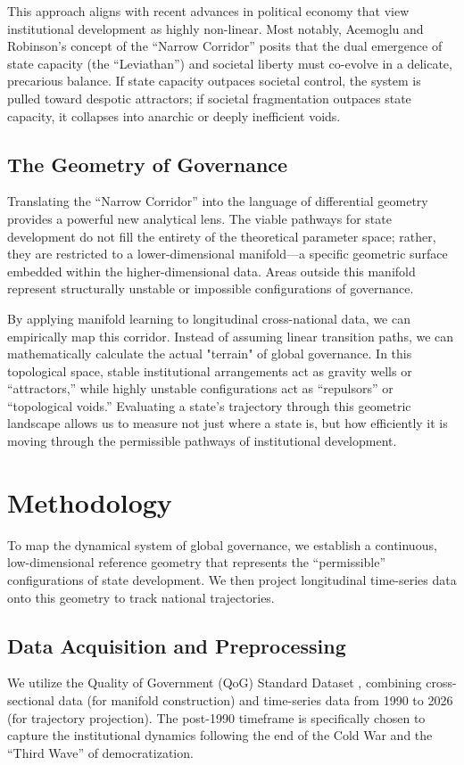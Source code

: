 \documentclass[12pt]{article}
\begin{document}
This approach aligns with recent advances in political economy that view institutional development as highly non-linear. Most notably, Acemoglu and Robinson's concept of the ``Narrow Corridor'' \cite{acemoglu2019narrow} posits that the dual emergence of state capacity (the ``Leviathan'') and societal liberty must co-evolve in a delicate, precarious balance. If state capacity outpaces societal control, the system is pulled toward despotic attractors; if societal fragmentation outpaces state capacity, it collapses into anarchic or deeply inefficient voids.

\subsection{The Geometry of Governance}
Translating the ``Narrow Corridor'' into the language of differential geometry provides a powerful new analytical lens. The viable pathways for state development do not fill the entirety of the theoretical parameter space; rather, they are restricted to a lower-dimensional manifold—a specific geometric surface embedded within the higher-dimensional data. Areas outside this manifold represent structurally unstable or impossible configurations of governance.

By applying manifold learning to longitudinal cross-national data, we can empirically map this corridor. Instead of assuming linear transition paths, we can mathematically calculate the actual "terrain" of global governance. In this topological space, stable institutional arrangements act as gravity wells or ``attractors,'' while highly unstable configurations act as ``repulsors'' or ``topological voids.'' Evaluating a state's trajectory through this geometric landscape allows us to measure not just where a state is, but how efficiently it is moving through the permissible pathways of institutional development.

\section{Methodology}

To map the dynamical system of global governance, we establish a continuous, low-dimensional reference geometry that represents the ``permissible'' configurations of state development. We then project longitudinal time-series data onto this geometry to track national trajectories.

\subsection{Data Acquisition and Preprocessing}
We utilize the Quality of Government (QoG) Standard Dataset \cite{teorell2026qog}, combining cross-sectional data (for manifold construction) and time-series data from 1990 to 2026 (for trajectory projection). The post-1990 timeframe is specifically chosen to capture the institutional dynamics following the end of the Cold War and the ``Third Wave'' of democratization.
\end{document}
